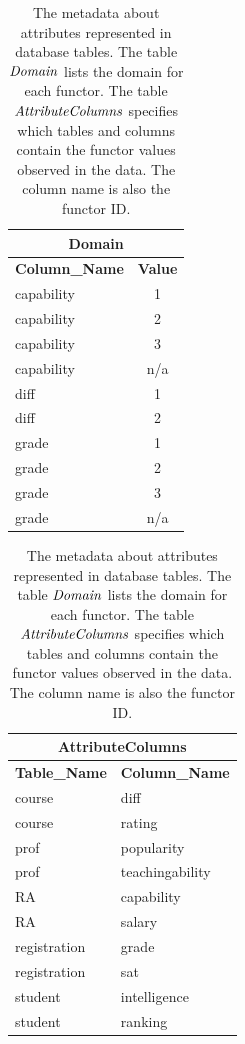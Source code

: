 \begin{table}[htbp]
  \centering
  \caption{  The metadata about attributes represented in \RVD database tables.  The table $\it{Domain}$ lists the domain for each functor. The table $\it{AttributeColumns}$ specifies which tables and columns contain the functor values observed in the data. The column name is also the functor ID.}
    \begin{tabular}{|l|c|}
    \multicolumn{2}{c}{\textbf{Domain}} \\ \hline
    \multicolumn{1}{|c|}{\textbf{Column\_Name}} &\multicolumn{1}{|c|}{\textbf{Value}} \\ \hline
    capability & 1 \\ \hline
    capability & 2 \\ \hline
    capability & 3 \\ \hline
    capability & n/a \\ \hline
    diff  & 1 \\ \hline
    diff  & 2 \\ \hline
    grade & 1 \\ \hline
    grade & 2 \\ \hline
    grade & 3 \\ \hline
    grade & n/a \\ \hline
    \end{tabular} 
    \rule{0pt}{4ex} 
     \begin{tabular}{|l|l|}
    \multicolumn{2}{c}{\textbf{AttributeColumns}} \\ \hline
    \multicolumn{1}{|c|}{\textbf{Table\_Name}} & \multicolumn{1}{|c|}{\textbf{Column\_Name}} \\ \hline
    course & diff \\ \hline
    course & rating \\ \hline
    prof  & popularity \\ \hline
    prof  & teachingability \\ \hline
    RA    & capability \\ \hline
    RA    & salary \\ \hline
    registration & grade \\ \hline
    registration & sat \\ \hline
    student & intelligence \\ \hline
    student & ranking \\ \hline
    \end{tabular}%

  \label{tab:attributes}%
\end{table}%

